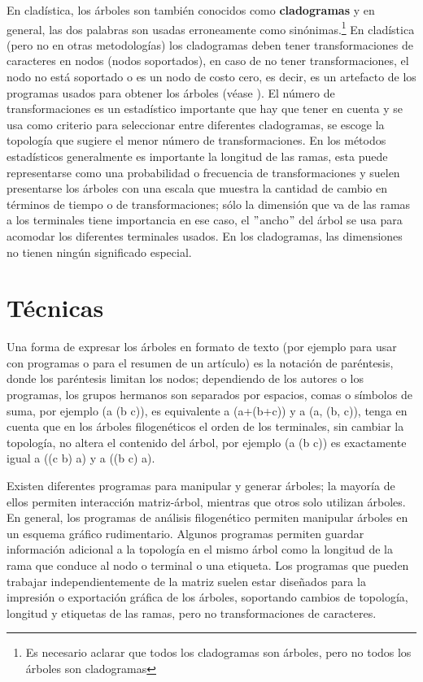 En clad\'istica, los \'arboles son tambi\'en conocidos como \textbf{cladogramas} y en general, las dos palabras son usadas erroneamente como sin\'onimas.\footnote{Es necesario aclarar que todos los cladogramas son \'arboles, pero no todos los \'arboles son cladogramas} En clad\'istica (pero no en otras metodolog\'ias) los cladogramas deben tener transformaciones de caracteres en nodos (nodos soportados), en caso de no tener transformaciones, el nodo no est\'a soportado o es un nodo de costo cero, es decir, es un artefacto de los programas usados para obtener los \'arboles (v\'ease \cite{Coddington1994,Goloboff1998}). El n\'umero de transformaciones es un estad\'istico importante que hay que tener en cuenta y se usa como criterio para seleccionar entre diferentes cladogramas, se escoge la topolog\'ia que sugiere el  menor n\'umero de transformaciones. En los m\'etodos estad\'isticos generalmente es importante la longitud  de las ramas, esta puede representarse como una probabilidad o frecuencia de transformaciones y suelen presentarse los \'arboles con una escala que muestra la cantidad de cambio en t\'erminos de tiempo o de transformaciones; s\'olo la dimensi\'on que va de las ramas a los terminales tiene importancia en ese caso, el $"$ancho$"$ del \'arbol se usa para acomodar los diferentes terminales usados. En los cladogramas, las dimensiones no tienen ning\'un significado especial.

\section*{T\'ecnicas}

Una forma de expresar los \'arboles en formato de texto (por ejemplo para usar con programas o para el resumen de un art\'iculo) es la notaci\'on de par\'entesis, donde los par\'entesis limitan los nodos; dependiendo de los autores o los programas, los grupos hermanos son separados por espacios, comas o s\'imbolos de suma, por ejemplo (a (b c)), es equivalente a (a+(b+c)) y a (a, (b, c)), tenga en cuenta que en los \'arboles filogen\'eticos el orden de los terminales, sin cambiar la topolog\'ia, no altera el contenido del \'arbol, por ejemplo (a (b c)) es exactamente igual a ((c b) a) y a ((b c) a).

Existen diferentes programas para manipular y generar \'arboles; la mayor\'ia de ellos permiten interacci\'on matriz-\'arbol, mientras que otros solo utilizan \'arboles. En general, los programas de an\'alisis filogen\'etico permiten manipular \'arboles en un esquema gr\'afico rudimentario. Algunos programas permiten guardar informaci\'on adicional a la topolog\'ia en el mismo \'arbol como la longitud  de la rama que conduce al nodo o terminal o una etiqueta. Los programas que pueden trabajar independientemente de la matriz suelen estar dise\~nados para la impresi\'on o exportaci\'on gr\'afica de los \'arboles, soportando cambios de topolog\'ia, longitud  y etiquetas de las ramas, pero no transformaciones de caracteres.


